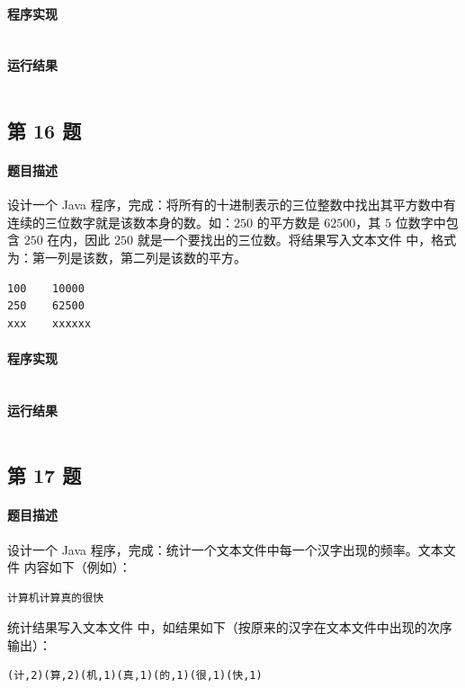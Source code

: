 \documentclass{academics}
\begin{document}
{\paragraph{程序实现} {
    \inputminted[label=MatrixTranspose.java]{java}{../src/P15/MatrixTranspose.java}
}

\paragraph{运行结果} {
    \inputminted{text}{../res/P15.out}
}

\subsection{第 16 题}

\paragraph{题目描述} {
    设计一个 Java 程序，完成：将所有的十进制表示的三位整数中找出其平方数中有连续的三位数字就是该数本身的数。如：$250$ 的平方数是 $62500$，其 $5$ 位数字中包含 $250$ 在内，因此 $250$ 就是一个要找出的三位数。将结果写入文本文件  中，格式为：第一列是该数，第二列是该数的平方。
    \begin{verbatim}
100    10000
250    62500
xxx    xxxxxx
\end{verbatim}
}

\paragraph{程序实现} {
    \inputminted[label=SquareContains.java]{java}{../src/P16/SquareContains.java}
}

\paragraph{运行结果} {
    \inputminted{text}{../res/P16.out}
}

\subsection{第 17 题}

\paragraph{题目描述} {
    设计一个 Java 程序，完成：统计一个文本文件中每一个汉字出现的频率。文本文件  内容如下（例如）：
    \begin{verbatim}
计算机计算真的很快
\end{verbatim}
    统计结果写入文本文件  中，如结果如下（按原来的汉字在文本文件中出现的次序输出）：
    \begin{verbatim}
(计,2)(算,2)(机,1)(真,1)(的,1)(很,1)(快,1)
\end{verbatim}
}

}
\end{document}
